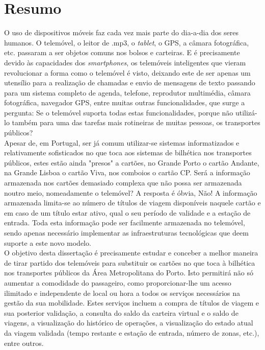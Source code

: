 \chapter*{Resumo}

O uso de dispositivos móveis faz cada vez mais parte do dia-a-dia dos seres humanos. O telemóvel, o leitor de .mp3, o \textit{tablet}, o GPS, a câmara fotográfica, etc. passaram a ser objetos comuns nos bolsos e carteiras. E é precisamente devido às capacidades dos \textit{smartphones}, os telemóveis inteligentes que vieram revolucionar a forma como o telemóvel é visto, deixando este de ser apenas um utensílio para a realização de chamadas e envio de mensagens de texto passando para um sistema completo de agenda, telefone, reprodutor multimédia, câmara fotográfica, navegador GPS, entre muitas outras funcionalidades, que surge a pergunta: Se o telemóvel suporta todas estas funcionalidades, porque não utilizá-lo também para uma das tarefas mais rotineiras de muitas pessoas, os transportes públicos?
\\Apesar de, em Portugal, ser já comum utilizar-se sistemas informatizados e relativamente sofisticados no que toca aos sistemas de bilhética nos transportes públicos, estes estão ainda "presos" a cartões, no Grande Porto o cartão Andante, na Grande Lisboa o cartão Viva, nos comboios o cartão CP. Será a informação armazenada nos cartões demasiado complexa que não possa ser armazenada noutro meio, nomeadamente o telemóvel? A resposta é óbvia, Não! A informação armazenada limita-se ao número de títulos de viagem disponíveis naquele cartão e em caso de um título estar ativo, qual o seu período de validade e a estação de entrada. Toda esta informação pode ser facilmente armazenada no telemóvel, sendo apenas necessário implementar as infraestruturas tecnológicas que deem suporte a este novo modelo.
\\O objetivo desta dissertação é precisamente estudar e conceber a melhor maneira de tirar partido dos telemóveis para substituir os cartões no que toca à bilhética nos transportes públicos da Área Metropolitana do Porto. Isto permitirá não só aumentar a comodidade do passageiro, como proporcionar-lhe um acesso ilimitado e independente de local ou hora a todos os serviços necessários na gestão da sua mobilidade. Estes serviços incluem a compra de títulos de viagem e sua posterior validação, a consulta do saldo da carteira virtual e o saldo de viagens, a visualização do histórico de operações, a visualização do estado atual da viagem validada (tempo restante e estação de entrada, número de zonas, etc.), entre outros.
